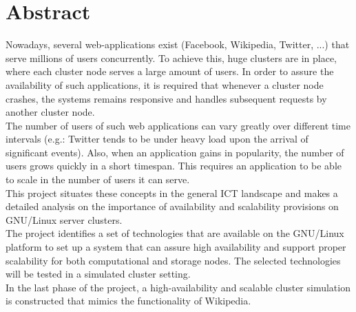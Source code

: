 \documentclass[12pt]{report}
\begin{document}
\section{Abstract}
Nowadays, several web-applications exist (Facebook, Wikipedia, Twitter, ...) that serve millions of users concurrently. To achieve this, huge clusters are in place, where each cluster node serves a large amount of users. In order to assure the availability of such applications, it is required that whenever a cluster node crashes, the systems remains responsive and handles subsequent requests by another cluster node.\\
The number of users of such web applications can vary greatly over different time intervals (e.g.: Twitter tends to be under heavy load upon the arrival of significant events). Also, when an application gains in popularity, the number of users grows quickly in a short timespan. This requires an application to be able to scale in the number of users it can serve.\\
This project situates these concepts in the general ICT landscape and makes a detailed analysis on the importance of availability and scalability provisions on GNU/Linux server clusters.\\
The project identifies a set of technologies that are available on the GNU/Linux platform to set up a system that can assure high availability and support proper scalability for both computational and storage nodes. The selected technologies will be tested in a simulated cluster setting.\\
In the last phase of the project, a high-availability and scalable
cluster simulation is constructed that mimics the functionality of
Wikipedia.
\end{document}
